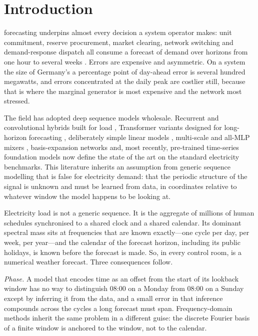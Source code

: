 \section{Introduction}
 forecasting underpins almost every decision a system operator makes:
unit commitment, reserve procurement, market clearing, network switching and demand-response
dispatch all consume a forecast of demand over horizons from one hour to several weeks
\cite{hong2016tutorial,hong2020review}. Errors are expensive and asymmetric. On a system the size of Germany's a percentage point of
day-ahead error is several hundred megawatts, and errors concentrated at the daily peak are
costlier still, because that is where the marginal generator is most expensive and the network most
stressed.

The field has adopted deep sequence models wholesale. Recurrent and convolutional hybrids
built for load \cite{kong2019lstm,salam2021inception}, Transformer variants designed for
long-horizon forecasting \cite{zhou2021informer,wu2021autoformer,nie2023patchtst,%
liu2024itransformer,wang2024timexer}, deliberately simple linear models
\cite{zeng2023dlinear,li2023rlinear,xu2024fits}, multi-scale and all-MLP mixers
\cite{wang2024timemixer,chen2023tsmixer}, basis-expansion networks
\cite{oreshkin2020nbeats,challu2023nhits} and, most recently, pre-trained time-series
foundation models \cite{ansari2024chronos,das2024timesfm} now define the state of the art on
the standard electricity benchmarks. This literature inherits an assumption from generic
sequence modelling that is false for electricity demand: that the periodic structure of the
signal is unknown and must be learned from data, in coordinates relative to whatever window
the model happens to be looking at.

Electricity load is not a generic sequence. It is the aggregate of millions of human
schedules synchronised to a shared clock and a shared calendar. Its dominant spectral mass
sits at frequencies that are known exactly---one cycle per day, per week, per year---and the
calendar of the forecast horizon, including its public holidays, is known before the forecast
is made. So, in every control room, is a numerical weather forecast. Three consequences follow.

\emph{Phase.} A model that encodes time as an offset from the start of its lookback window has
no way to distinguish 08:00 on a Monday from 08:00 on a Sunday except by inferring it from the
data, and a small error in that inference compounds across the cycles a long forecast must
span. Frequency-domain methods \cite{zhou2022fedformer,xu2024fits} inherit the same problem
in a different guise: the discrete Fourier basis of a finite window is anchored to the window,
not to the calendar.

